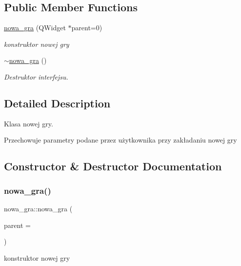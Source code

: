 \subsection*{Public Member Functions}
\begin{DoxyCompactItemize}
\item 
\mbox{\hyperlink{classnowa__gra_a154dd9cfc2c4f5e8657c048455d3fb32}{nowa\+\_\+gra}} (Q\+Widget $\ast$parent=0)
\begin{DoxyCompactList}\small\item\em konstruktor nowej gry \end{DoxyCompactList}\item 
\mbox{\hyperlink{classnowa__gra_acd5a1be18c4857d7606a5ec85759f025}{$\sim$nowa\+\_\+gra}} ()
\begin{DoxyCompactList}\small\item\em Destruktor interfejsu. \end{DoxyCompactList}\end{DoxyCompactItemize}


\subsection{Detailed Description}
Klasa nowej gry. 

Przechowuje parametry podane przez użytkownika przy zakładaniu nowej gry 

\subsection{Constructor \& Destructor Documentation}
\mbox{\label{classnowa__gra_a154dd9cfc2c4f5e8657c048455d3fb32}} 
\subsubsection{\texorpdfstring{nowa\+\_\+gra()}{nowa\_gra()}}
{\footnotesize\ttfamily nowa\+\_\+gra\+::nowa\+\_\+gra (\begin{DoxyParamCaption}\item[{Q\+Widget $\ast$}]{parent = {} }\end{DoxyParamCaption})\hspace{0.3cm}{\ttfamily [explicit]}}



konstruktor nowej gry 


